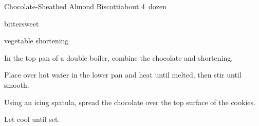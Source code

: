 \begin{recipe}{Chocolate-Sheathed Almond Biscotti}{}{about 4\half\ dozen}

\begin{ingredients}
\item {} bittersweet 
\item \tp{\half} vegetable shortening
\end{ingredients}

\begin{directions}
\item In the top pan of a double boiler, combine the chocolate and shortening.
\item Place over hot water in the lower pan and heat until melted, then stir until smooth.
\item Using an icing spatula, spread the chocolate over the top surface of the cookies.
\item Let cool until set.
\end{directions}

\end{recipe}
